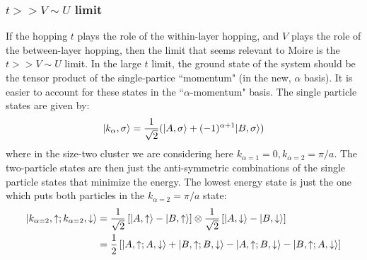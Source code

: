 \documentclass[12pt]{article}
\DeclarePairedDelimiter\ket{\lvert}{\rangle}%
\numberwithin{equation}{section}
\begin{document}
\subsubsection{$t>>V\sim U$ limit}
If the hopping $t$ plays the role of the within-layer hopping, and $V$ plays the role of the between-layer hopping, then the limit that seems relevant to Moire is the $t>>V\sim U$ limit. In the large $t$ limit, the ground state of the system should be the tensor product of the single-partice ``momentum" (in the new, $\alpha$ basis). It is easier to account for these states in the ``$\alpha$-momentum" basis. The single particle states are given by:
\begin{equation}
    \ket{k_{\alpha},\sigma}=\frac{1}{\sqrt{2}}(\ket{A,\sigma}+(-1)^{\alpha+1}\ket{B,\sigma})
\end{equation}
where in the size-two cluster we are considering here $k_{\alpha=1}=0,k_{\alpha=2}=\pi/a$. The two-particle states are then just the anti-symmetric combinations of the single particle states that minimize the energy. The lowest energy state is just the one which puts both particles in the $k_{\alpha=2}=\pi/a$ state:
\begin{align}
    \ket{k_{\alpha=2},\uparrow;k_{\alpha=2},\downarrow}&=
    \frac{1}{\sqrt{2}}\left[\ket{A,\uparrow}-\ket{B,\uparrow}\right]\otimes
    \frac{1}{\sqrt{2}}\left[\ket{A,\downarrow}-\ket{B,\downarrow}\right]\\
    &=\frac{1}{2}\left[\ket{A,\uparrow;A,\downarrow}+\ket{B,\uparrow;B,\downarrow}
    -\ket{A,\uparrow;B,\downarrow}-\ket{B,\uparrow;A,\downarrow}\right]
\end{align}
\end{document}
